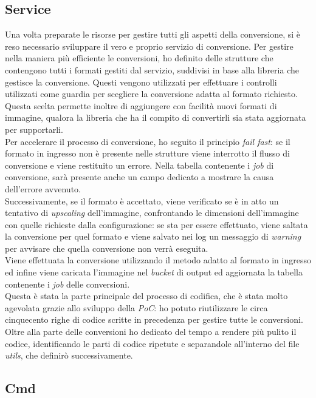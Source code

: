\subsection{Service}

Una volta preparate le risorse per gestire tutti gli aspetti della conversione,
si è reso necessario sviluppare il vero e proprio servizio di conversione.
Per gestire nella maniera più efficiente le conversioni, ho definito delle strutture che contengono tutti i formati gestiti dal
servizio, suddivisi in base alla libreria che gestisce la conversione. Questi vengono
utilizzati per effettuare i controlli utilizzati come guardia per scegliere la
conversione adatta al formato richiesto. Questa scelta permette inoltre di
aggiungere con facilità nuovi formati di immagine, qualora la libreria che ha il
compito di convertirli sia stata aggiornata per supportarli. \\
Per accelerare il processo di
conversione, ho seguito il principio \emph{fail fast}: se il formato in ingresso
non è presente nelle strutture viene interrotto il flusso di conversione e viene restituito un
errore. Nella tabella contenente i \emph{job} di conversione, sarà presente
anche un campo dedicato a mostrare la causa dell'errore avvenuto.\\
Successivamente, se il formato è accettato, viene verificato se è in atto un tentativo di
\emph{upscaling} dell'immagine, confrontando le dimensioni dell'immagine con
quelle richieste dalla configurazione: se sta per essere effettuato, viene
saltata la conversione per quel formato e viene salvato nei log un messaggio di
\emph{warning} per avvisare che quella conversione non verrà eseguita.\\
Viene effettuata la conversione utilizzando il metodo adatto al formato in
ingresso ed infine viene caricata l'immagine nel \emph{bucket} di output ed
aggiornata la tabella contenente i \emph{job} delle conversioni.\\
Questa è stata la parte principale del processo di codifica, che è stata molto
agevolata grazie allo sviluppo della \emph{PoC}: ho potuto riutilizzare le circa
cinquecento righe di codice scritte in precedenza per gestire tutte le
conversioni. Oltre alla parte delle conversioni ho dedicato del tempo a rendere
più pulito il codice, identificando le parti di codice ripetute e separandole
all'interno del file \emph{utils}, che definirò successivamente.

\subsection{Cmd}

